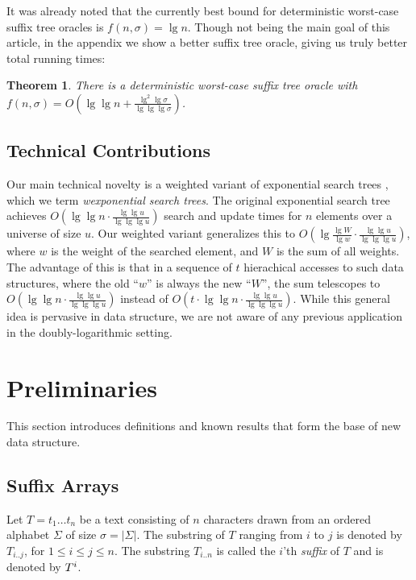 \documentclass[11pt,onecolumn,final]{article} \usepackage{a4}
\theoremstyle{plain}
\newtheorem{theorem}[definition]{Theorem}
\theoremstyle{remark}
\begin{document}
It was already noted that the currently best bound \cite{Amir05towards} for deterministic worst-case suffix tree oracles is $f(n,\sigma)=\lg n$. Though not being the main goal of this article, in the appendix we show a better suffix tree oracle, giving us truly better total running times:

\begin{theorem}
  \label{thm:main3}
There is a deterministic worst-case suffix tree oracle with $f(n,\sigma)=O(\lg\lg n + \frac{\lg^2\lg\sigma}{\lg\lg\lg\sigma})$.
\end{theorem}

\subsection{Technical Contributions}
Our main technical novelty is a weighted variant of exponential search trees \cite{andersson07dynamic}, which we term \emph{wexponential search trees}. The original exponential search tree achieves $O(\lg\lg n \cdot \frac{\lg\lg u}{\lg\lg\lg u})$ search and update times for $n$ elements over a universe of size $u$. Our weighted variant generalizes this to $O(\lg\frac{\lg W}{\lg w} \cdot \frac{\lg\lg u}{\lg\lg\lg u})$, where $w$ is the weight of the searched element, and $W$ is the sum of all weights. The advantage of this is that in a sequence of $t$ hierachical accesses to such data structures, where the old ``$w$'' is always the new ``$W$'', the sum telescopes to $O(\lg\lg n \cdot \frac{\lg\lg u}{\lg\lg\lg u})$ instead of $O(t\cdot\lg\lg n \cdot \frac{\lg\lg u}{\lg\lg\lg u})$. While this general idea is pervasive in data structure, we are not aware of any previous application in the doubly-logarithmic setting.

\section{Preliminaries}
\label{sect:preliminaries}
This section introduces definitions and known results that form the base of new data structure.

\subsection{Suffix Arrays}
Let $T=t_1\dots t_n$ be a text consisting of $n$ characters drawn from an ordered alphabet $\Sigma$ of size $\sigma = |\Sigma|$. The substring of $T$ ranging from $i$ to $j$ is denoted by $T_{i..j}$, for $1\le i \le j \le n$. The substring $T_{i..n}$ is called the $i$'th \emph{suffix} of $T$ and is denoted by $T^{i}$.
\end{document}
